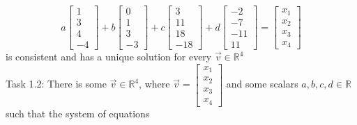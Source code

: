 \documentclass{article}
\begin{document}
{{$$
a \left[\begin{matrix} 1 \\ 3 \\ 4 \\ -4 \end{matrix}\right] +
b \left[\begin{matrix} 0 \\ 1 \\ 3 \\ -3 \end{matrix}\right] +
c \left[\begin{matrix} 3 \\ 11 \\ 18 \\ -18 \end{matrix}\right] +
d \left[\begin{matrix}-2 \\ -7 \\ -11 \\ 11 \end{matrix}\right] = \left[\begin{matrix}x_{1} \\ x_{2} \\ x_{3} \\ x_{4} \end{matrix} \right]$$ 
is consistent and has a unique solution for every $\vec{v} \in \mathbb{R}^{4}$\\

Task 1.2:
There is some $\vec{v} \in \mathbb{R}^{4}$, where $\vec{v} = \left[\begin{matrix}x_{1} \\ x_{2} \\ x_{3} \\ x_{4} \end{matrix} \right]$ and some scalars $a,b,c,d \in \mathbb{R}$ such that the system of equations\\

}}
\end{document}
